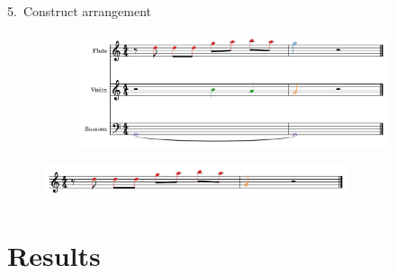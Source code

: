 \documentclass[handout]{beamer}
\begin{document}
\begin{frame}{5.\ Construct arrangement}
    \begin{figure}
        \begin{subfigure}{0.5\textwidth}
            \includegraphics[width=\textwidth]{toy-1.png}
        \end{subfigure}\hfill
        \begin{subfigure}{0.5\textwidth}
            \resizebox{\textwidth}{!}{}
        \end{subfigure}
    \end{figure}
    \pause
    \centering
    \begin{figure}
        \includegraphics[width=0.8\textwidth]{toy_arrangement-1.png}
    \end{figure}

\end{frame}

\section{Results} %
\end{document}
